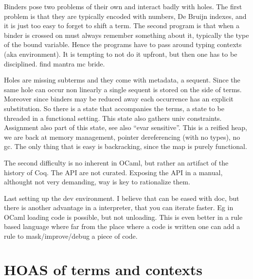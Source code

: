 \documentclass[a4paper, 11pt]{book}
\begin{document}
Binders pose two problems of their own and interact badly with holes.
The first problem is that they are typically encoded with numbers, De Bruijn
indexes, and it is just too easy to forget to shift a term.  The second program
is that when a binder is crossed on must always remember something about it,
typically the type of the bound variable. Hence the programs have to pass around
typing contexts (aka environment). It is tempting to not do it upfront, but
then one has to be disciplined. find mantra mc bride.

Holes are missing subterms and they come with metadata, a sequent.
Since the same hole can occur non linearly a single sequent is stored on the side of terms.
Moreover since binders may be reduced away each occurrence has an explicit
substitution. So there is a state that accompanies the terms, a state to be
threaded in a functional setting. This state also gathers univ constraints.
Assignment also part of this state, see also ``evar sensitive''. This is
a reified heap, we are back at memory management, pointer dereferencing (with no
types), no gc. The only thing that is easy is backracking, since the map is
purely functional.

The second difficulty is no inherent in OCaml, but rather an artifact of the
history of Coq. The API are not curated. Exposing the API in a manual, althought
not very demanding, way is key to rationalize them.


Last setting up the dev environment. I believe that can be eased with doc, but
there is another advantage in a interpreter, that you can iterate faster. Eg
in OCaml loading code is possible, but not unloading. This is even better in
a rule based language where far from the place where a code is written one
can add a rule to mask/improve/debug a piece of code.

\section{HOAS of terms and contexts}\label{GALLINA}
\end{document}
